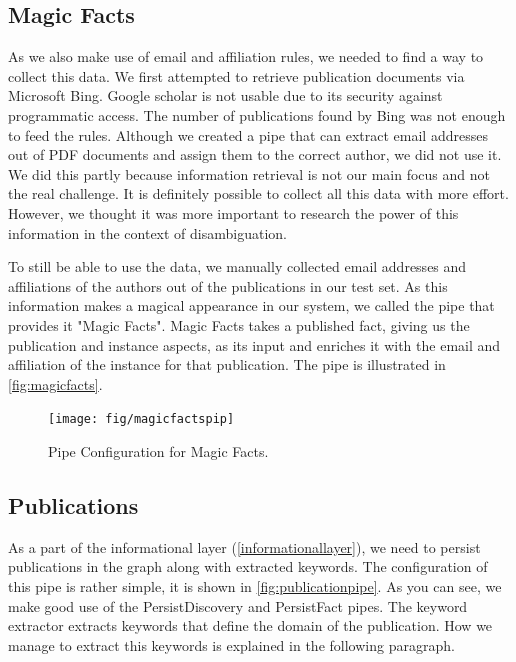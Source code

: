 \subsection{Magic Facts}

As we also make use of email and affiliation rules, we needed to find a way to collect this data. We first attempted to retrieve publication documents via Microsoft Bing. Google scholar is not usable due to its security against programmatic access. The number of publications found by Bing was not enough to feed the rules. Although we created a pipe that can extract email addresses out of PDF documents and assign them to the correct author, we did not use it. We did this partly because information retrieval is not our main focus and not the real challenge. It is definitely possible to collect all this data with more effort. However, we thought it was more important to research the power of this information in the context of disambiguation.

To still be able to use the data, we manually collected email addresses and affiliations of the authors out of the publications in our test set. As this information makes a magical appearance in our system, we called the pipe that provides it "Magic Facts". Magic Facts takes a published fact, giving us the publication and instance aspects, as its input and enriches it with the email and affiliation of the instance for that publication. The pipe is illustrated in \autoref{fig:magicfacts}.

\begin{figure}[htb]
	\centering
		\texttt{[image: fig/magicfactspip]}
	\caption{Pipe Configuration for Magic Facts.}
	\label{fig:magicfacts}
\end{figure}

\subsection{Publications}

As a part of the informational layer (\autoref{informationallayer}), we need to persist publications in the graph along with extracted keywords. The configuration of this pipe is rather simple, it is shown in \autoref{fig:publicationpipe}. As you can see, we make good use of the PersistDiscovery and PersistFact pipes. The keyword extractor extracts keywords that define the domain of the publication. How we manage to extract this keywords is explained in the following paragraph.

